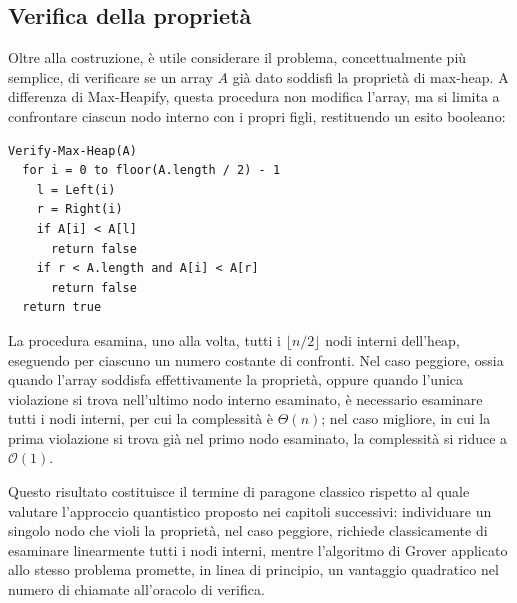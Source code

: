 \subsection{Verifica della proprietà}
Oltre alla costruzione, è utile considerare il problema, concettualmente più semplice, di verificare se un array $A$ già dato soddisfi la proprietà di max-heap. A differenza di Max-Heapify, questa procedura non modifica l'array, ma si limita a confrontare ciascun nodo interno con i propri figli, restituendo un esito booleano:
\begin{lstlisting}[caption={Verify-Max-Heap},label=lst:verify-max-heap]
Verify-Max-Heap(A)
  for i = 0 to floor(A.length / 2) - 1
    l = Left(i)
    r = Right(i)
    if A[i] < A[l]
      return false
    if r < A.length and A[i] < A[r]
      return false
  return true
\end{lstlisting}
La procedura esamina, uno alla volta, tutti i $\lfloor n/2 \rfloor$ nodi interni dell'heap, eseguendo per ciascuno un numero costante di confronti. Nel caso peggiore, ossia quando l'array soddisfa effettivamente la proprietà, oppure quando l'unica violazione si trova nell'ultimo nodo interno esaminato, è necessario esaminare tutti i nodi interni, per cui la complessità è $\Theta(n)$; nel caso migliore, in cui la prima violazione si trova già nel primo nodo esaminato, la complessità si riduce a $\mathcal{O}(1)$.

Questo risultato costituisce il termine di paragone classico rispetto al quale valutare l'approccio quantistico proposto nei capitoli successivi: individuare un singolo nodo che violi la proprietà, nel caso peggiore, richiede classicamente di esaminare linearmente tutti i nodi interni, mentre l'algoritmo di Grover applicato allo stesso problema promette, in linea di principio, un vantaggio quadratico nel numero di chiamate all'oracolo di verifica.